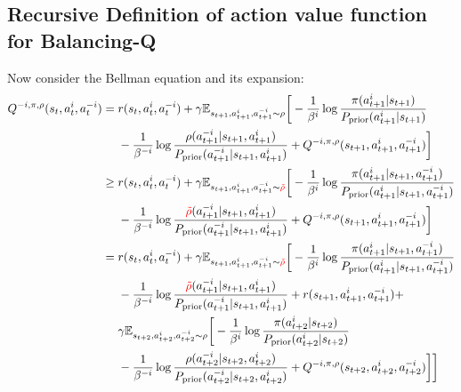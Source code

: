 \subsection{Recursive Definition of action value function for Balancing-Q}
\label{appx:chap4-balancing-q-recrusive-Q}
Now consider the Bellman equation and its expansion:
\begin{equation*}
\begin{aligned}
Q^{-i, \pi, \rho}(s_t, a^i_t, a^{-i}_t) &= \begin{aligned}[t]
        &r(s_t, a^i_t, a^{-i}_t) + \gamma \mathbb{E}_{s_{t+1}, a^i_{t+1}, a^{-i}_{t+1}\sim\rho} \bigg[ - \frac{1}{\beta^{i}}\log \frac{\pi(a^i_{t+1} | s_{t+1})}{P_{\prior}(a^i_{t+1} | s_{t+1}) } \\
        & - \frac{1}{\beta^{-i}}\log \frac{\rho(a^{-i}_{t+1} | s_{t+1}, a^i_{t+1})}{P_{\prior}(a^{-i}_{t+1} | s_{t+1}, a^i_{t+1})}  + Q^{-i, \pi, \rho}(s_{t+1}, a^i_{t+1}, a^{-i}_{t+1}) \bigg]
    \end{aligned} \\ 
    &\ge \begin{aligned}[t]
        &r(s_t, a^i_t, a^{-i}_t) + \gamma \mathbb{E}_{s_{t+1}, a^i_{t+1}, a^{-i}_{t+1}\sim\red{\tilde{\rho}}} \bigg[ - \frac{1}{\beta^{i}}\log \frac{\pi(a^i_{t+1} | s_{t+1}, a^{-i}_{t+1})}{P_{\prior}(a^i_{t+1} | s_{t+1}, a^{-i}_{t+1}) } \\
        & - \frac{1}{\beta^{-i}}\log \frac{\red{\tilde{\rho}}(a^{-i}_{t+1} | s_{t+1}, a^i_{t+1})}{P_{\prior}(a^{-i}_{t+1} | s_{t+1}, a^i_{t+1})}  + Q^{-i, \pi, \rho}(s_{t+1}, a^i_{t+1}, a^{-i}_{t+1}) \bigg]
    \end{aligned} \\ 
    &= \begin{aligned}[t]
        &r(s_t, a^i_t, a^{-i}_t) + \gamma \mathbb{E}_{s_{t+1}, a^i_{t+1}, a^{-i}_{t+1} \sim \red{\tilde{\rho}}} \bigg[ - \frac{1}{\beta^{i}}\log \frac{\pi(a^i_{t+1} | s_{t+1}, a^{-i}_{t+1})}{P_{\prior}(a^i_{t+1} | s_{t+1}, a^{-i}_{t+1}) } \\
        & - \frac{1}{\beta^{-i}}\log \frac{\red{\tilde{\rho}}(a^{-i}_{t+1} | s_{t+1}, a^i_{t+1})}{P_{\prior}(a^{-i}_{t+1} | s_{t+1}, a^i_{t+1})}  +  r(s_{t+1}, a^i_{t+1}, a^{-i}_{t+1}) + \\
        &\gamma \mathbb{E}_{s_{t+2}, a^i_{t+2}, a^{-i}_{t+2} \sim \rho} \bigg[ - \frac{1}{\beta^{i}}\log \frac{\pi(a^i_{t+2} | s_{t+2})}{P_{\prior}(a^i_{t+2} | s_{t+2}) } \\
        & - \frac{1}{\beta^{-i}}\log \frac{\rho(a^{-i}_{t+2} | s_{t+2}, a^i_{t+2})}{P_{\prior}(a^{-i}_{t+2} | s_{t+2}, a^i_{t+2})}  + Q^{-i, \pi, \rho}(s_{t+2}, a^i_{t+2}, a^{-i}_{t+2}) \bigg]\bigg]

\end{aligned}
\end{aligned}
\end{equation*}
